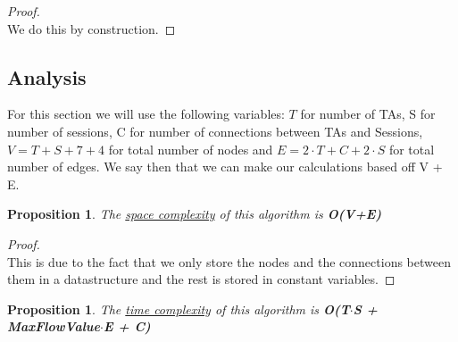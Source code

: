 \documentclass[12pt]{article}
\newtheorem{proposition}[theorem]{Proposition}
\begin{document}
\begin{proof}
~ \\ \indent We do this by construction. 
\end{proof}


\subsection{Analysis}
For this section we will use the following variables: $T$ for number of TAs, S for number of
sessions, C for number of connections between TAs and Sessions, $V = T + S + 7 + 4$ for total
number of nodes and $E = 2\cdot T + C + 2\cdot S$ for total number of edges. We say then that
we can make our calculations based off V + E.

\begin{proposition}
\label{numq}
The \underline{space complexity} of this algorithm is \textbf{O(V+E)}
\end{proposition}

\begin{proof}
~ \\ \indent This is due to the fact that we only store the nodes and the connections between
them in a datastructure and the rest is stored in constant variables.
\end{proof}

\begin{proposition}
\label{numq}
The \underline{time complexity} of this algorithm is \textbf{O(T$\cdot$S + MaxFlowValue$\cdot$E + C)}
\end{proposition}
\end{document}
